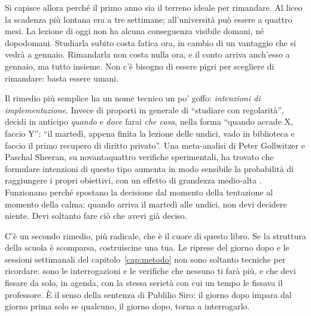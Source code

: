Si capisce allora perché il primo anno sia il terreno ideale per
rimandare. Al liceo la scadenza più lontana era a tre settimane;
all'università può essere a quattro mesi. La lezione di oggi non ha
alcuna conseguenza visibile domani, né dopodomani. Studiarla subito
costa fatica ora, in cambio di un vantaggio che si vedrà a gennaio.
Rimandarla non costa nulla ora, e il conto arriva anch'esso a gennaio,
ma tutto insieme. Non c'è bisogno di essere pigri per scegliere di
rimandare: basta essere umani.

Il rimedio più semplice ha un nome tecnico un po' goffo:
\emph{intenzioni di implementazione}. Invece di proporti in generale di
\enquote{studiare con regolarità}, decidi in anticipo \emph{quando} e
\emph{dove} farai \emph{che cosa}, nella forma \enquote{quando accade
X, faccio Y}: \enquote{il martedì, appena finita la lezione delle
undici, vado in biblioteca e faccio il primo recupero di diritto
privato}. Una meta-analisi di Peter Gollwitzer e Paschal Sheeran, su
novantaquattro verifiche sperimentali, ha trovato che formulare
intenzioni di questo tipo aumenta in modo sensibile la probabilità di
raggiungere i propri obiettivi, con un effetto di grandezza
medio-alta \parencite{gollwitzer2006}. Funzionano perché spostano la
decisione dal momento della tentazione al momento della calma: quando
arriva il martedì alle undici, non devi decidere niente. Devi soltanto
fare ciò che avevi già deciso.

C'è un secondo rimedio, più radicale, che è il cuore di questo libro.
Se la struttura della scuola è scomparsa, costruiscine una tua. Le
riprese del giorno dopo e le sessioni settimanali del
capitolo~\ref{cap:metodo} non sono soltanto tecniche per ricordare: sono
le interrogazioni e le verifiche che nessuno ti farà più, e che devi
fissare da solo, in agenda, con la stessa serietà con cui un tempo le
fissava il professore. È il senso della sentenza di Publilio Siro:
il giorno dopo impara dal giorno prima solo se qualcuno, il giorno
dopo, torna a interrogarlo.

